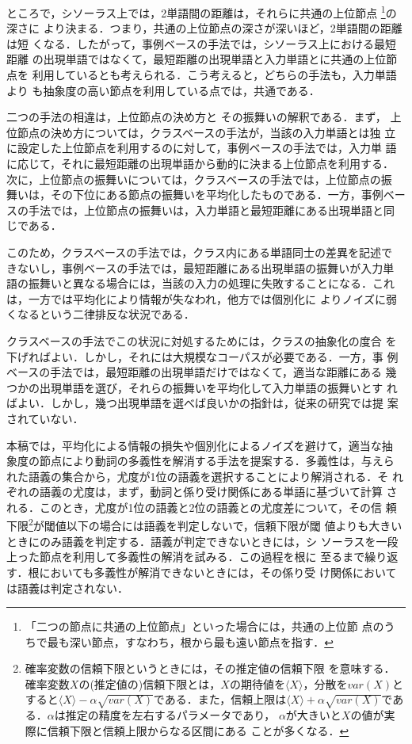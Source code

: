 ところで，シソーラス上では，2単語間の距離は，それらに共通の上位節点
\footnote{「二つの節点に共通の上位節点」といった場合には，共通の上位節
点のうちで最も深い節点，すなわち，根から最も遠い節点を指す．}の深さに
より決まる．つまり，共通の上位節点の深さが深いほど，2単語間の距離は短
くなる．したがって，事例ベースの手法では，シソーラス上における最短距離
の出現単語ではなくて，最短距離の出現単語と入力単語とに共通の上位節点を
利用しているとも考えられる．こう考えると，どちらの手法も，入力単語より
も抽象度の高い節点を利用している点では，共通である．

二つの手法の相違は，上位節点の決め方と その振舞いの解釈である．まず，
上位節点の決め方については，クラスベースの手法が，当該の入力単語とは独
立に設定した上位節点を利用するのに対して，事例ベースの手法では，入力単
語に応じて，それに最短距離の出現単語から動的に決まる上位節点を利用する．
次に，上位節点の振舞いについては，クラスベースの手法では，上位節点の振
舞いは，その下位にある節点の振舞いを平均化したものである．一方，事例ベー
スの手法では，上位節点の振舞いは，入力単語と最短距離にある出現単語と同
じである．

このため，クラスベースの手法では，クラス内にある単語同士の差異を記述で
きないし，事例ベースの手法では，最短距離にある出現単語の振舞いが入力単
語の振舞いと異なる場合には，当該の入力の処理に失敗することになる．これ
は，一方では平均化により情報が失なわれ\cite{Dagan93}，他方では個別化に
よりノイズに弱くなる\cite{Nomiyama93}という二律排反な状況である．

クラスベースの手法でこの状況に対処するためには，クラスの抽象化の度合
を下げればよい．しかし，それには大規模なコーパスが必要である．一方，事
例ベースの手法では，最短距離の出現単語だけではなくて，適当な距離にある
幾つかの出現単語を選び，それらの振舞いを平均化して入力単語の振舞いとす
ればよい．しかし，幾つ出現単語を選べば良いかの指針は，従来の研究では提
案されていない．

本稿では，平均化による情報の損失や個別化によるノイズを避けて，適当な抽
象度の節点により動詞の多義性を解消する手法を提案する．多義性は，与えら
れた語義の集合から，尤度が1位の語義を選択することにより解消される．そ
れぞれの語義の尤度は，まず，動詞と係り受け関係にある単語に基づいて計算
される．このとき，尤度が1位の語義と2位の語義との尤度差について，その信
頼下限\footnote{確率変数の信頼下限というときには，その推定値の信頼下限
を意味する．確率変数$X$の(推定値の)信頼下限とは，$X$の期待値を$\langle
X \rangle$，分散を$var(X)$とすると$\langle X \rangle - \alpha
\sqrt{var(X)}$である．また，信頼上限は$\langle X \rangle + \alpha
\sqrt{var(X)}$である．$\alpha$は推定の精度を左右するパラメータであり，
$\alpha$が大きいと$X$の値が実際に信頼下限と信頼上限からなる区間にある
ことが多くなる．}が閾値以下の場合には語義を判定しないで，信頼下限が閾
値よりも大きいときにのみ語義を判定する．語義が判定できないときには，シ
ソーラスを一段上った節点を利用して多義性の解消を試みる．この過程を根に
至るまで繰り返す．根においても多義性が解消できないときには，その係り受
け関係においては語義は判定されない．

